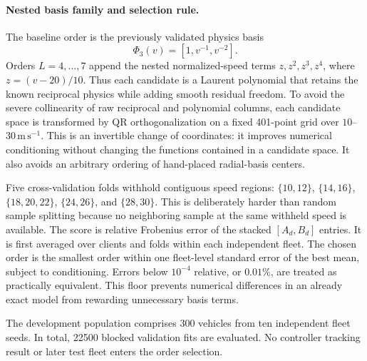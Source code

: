 \paragraph{Nested basis family and selection rule.}
The baseline order is the previously validated physics basis
\begin{equation}
 \Phi_3(v)=[1,v^{-1},v^{-2}].
\end{equation}
Orders $L=4,\ldots,7$ append the nested normalized-speed terms
$z,z^2,z^3,z^4$, where $z=(v-20)/10$. Thus each candidate is a Laurent
polynomial that retains the known reciprocal physics while adding smooth
residual freedom. To avoid the severe collinearity of raw reciprocal and
polynomial columns, each candidate space is transformed by QR orthogonalization
on a fixed 401-point grid over $10$--$30\,\mathrm{m\,s}^{-1}$. This is an
invertible change of coordinates: it improves numerical conditioning without
changing the functions contained in a candidate space. It also avoids an
arbitrary ordering of hand-placed radial-basis centers.

Five cross-validation folds withhold contiguous speed regions:
$\{10,12\}$, $\{14,16\}$, $\{18,20,22\}$, $\{24,26\}$, and $\{28,30\}$.
This is deliberately harder than random sample splitting because no neighboring
sample at the same withheld speed is available. The score is relative Frobenius
error of the stacked $[A_d,B_d]$ entries. It is first averaged over clients and
folds within each independent fleet. The chosen order is the smallest order
within one fleet-level standard error of the best mean, subject to conditioning.
Errors below $10^{-4}$ relative, or $0.01\%$, are treated as practically
equivalent. This floor prevents numerical differences in an already exact model
from rewarding unnecessary basis terms.

The development population comprises 300 vehicles from ten independent fleet
seeds. In total, 22500 blocked validation fits are evaluated. No controller
tracking result or later test fleet enters the order selection.

